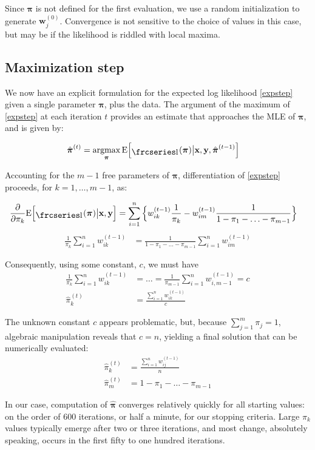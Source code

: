 \documentclass[12pt]{amsart}
\newcommand{\textfrc}[1]{{\frcseries#1}}
\newcommand{\mathfrc}[1]{\raisebox{-0.8mm}{\text{\textfrc{\small #1}}}\hspace{0.4mm}}
\newcommand{\vect}[1]{\boldsymbol{\mathbf{#1}}}
\newcommand{\eqn}[1]{\begin{align*}
#1
\end{align*}}
\newcommand{\eqnl}[2]{\begin{align} \label{#1}
#2
\end{align}}
\newcommand{\Bl}{\Big\{}
\newcommand{\Br}{\Big\}}
\newcommand{\argmax}{\operatornamewithlimits{argmax}}
\newcommand{\vx}{\vect{x}}
\newcommand{\vy}{\vect{y}}
\newcommand{\vp}{\vect{\pi}}
\newcommand{\vph}{\hat{\vect{\pi}}}
\newcommand{\llp}{\mathfrc{l}(\vect{\pi})}
\newcommand{\sumn}{\sum^n_{i=1}}
\newcommand{\summ}{\sum^m_{j=1}}
\begin{document}
Since $\vp$ is not defined for the first evaluation, we use a random initialization to generate $\vect{w}_{j}^{(0)}$. Convergence is not sensitive to the choice of values in this case, but may be if the likelihood is riddled with local maxima.

\subsection{Maximization step}
We now have an explicit formulation for the expected log likelihood \eqref{expstep} given a single parameter $\vp$, plus the data. The argument of the maximum of \eqref{expstep} at each iteration $t$ provides an estimate that approaches the MLE of $\vp$, and is given by:

\eqnl{argmaxpi}{
	\vph^{(t)} &= \argmax_{\vp} \text{E}\Big[\llp \big| \vx,\vy,\vph^{(t-1)} \Big]   
}

Accounting for the $m-1$ free parameters of $\vp$, differentiation of \eqref{expstep} proceeds, for $k=1,\ldots,m-1$, as:

\eqn{
	\frac{\partial}{\partial \pi_k} \text{E}\Big[\llp \big| \vect{x},\vect{y}\Big]   &=      \sumn \Bl  w^{(t-1)}_{ik} \frac{1}{\pi_k} - w^{(t-1)}_{im} \frac{1}{1-\pi_1-\ldots-\pi_{m-1}}   \Br
}
\eqn{
	\frac{1}{\pi_k} \sumn w_{ik}^{(t-1)} &= \frac{1}{1-\pi_1-\ldots-\pi_{m-1}} \sumn w_{im}^{(t-1)}
}

Consequently, using some constant, $c$, we must have
\eqn{
	\frac{1}{\pi_k} \sumn w^{(t-1)}_{ik} &= \ldots = \frac{1}{\pi_{m-1}} \sumn w^{(t-1)}_{i,m-1} = c	\\
	\hat{\pi}_k^{(t)} &= \frac{\sumn w^{(t-1)}_{ik}}{c}
}

The unknown constant $c$ appears problematic, but, because $\summ \pi_j = 1$, algebraic manipulation reveals that $c=n$, yielding a final solution that can be numerically evaluated:
\eqn{
	\hat{\pi}^{(t)}_k &= \frac{\sumn w^{(t-1)}_{ij}}{n}	\\
	\hat{\pi}^{(t)}_m &= 1-\pi_1-\ldots-\pi_{m-1}
}

In our case, computation of $\vph$ converges relatively quickly for all starting values: on the order of 600 iterations, or half a minute, for our stopping criteria. Large $\pi_k$ values typically emerge after two or three iterations, and most change, absolutely speaking, occurs in the first fifty to one hundred iterations.
\end{document}
